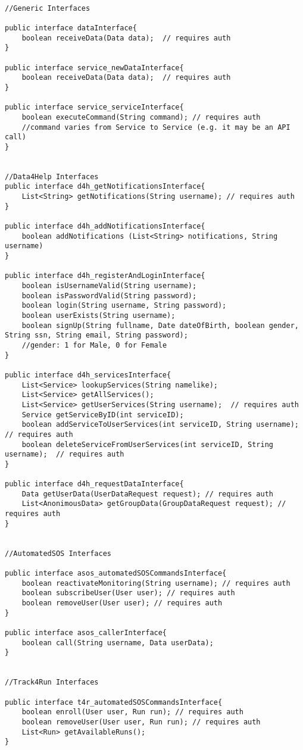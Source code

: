 \documentclass[../../DD.tex]{subfiles}
\begin{document}
\begin{lstlisting}

//Generic Interfaces

public interface dataInterface{
	boolean receiveData(Data data);  // requires auth
}

public interface service_newDataInterface{
	boolean receiveData(Data data);  // requires auth
}

public interface service_serviceInterface{
	boolean executeCommand(String command);	// requires auth
	//command varies from Service to Service (e.g. it may be an API call) 
}


//Data4Help Interfaces
public interface d4h_getNotificationsInterface{
	List<String> getNotifications(String username);	// requires auth
}

public interface d4h_addNotificationsInterface{
	boolean addNotifications (List<String> notifications, String username)
}

public interface d4h_registerAndLoginInterface{
	boolean isUsernameValid(String username);
	boolean isPasswordValid(String password);
	boolean login(String username, String password);
	boolean userExists(String username);
	boolean signUp(String fullname, Date dateOfBirth, boolean gender, String ssn, String email, String password);
	//gender: 1 for Male, 0 for Female
}

public interface d4h_servicesInterface{
	List<Service> lookupServices(String namelike);
	List<Service> getAllServices();
	List<Service> getUserServices(String username);  // requires auth
	Service getServiceByID(int serviceID);
	boolean addServiceToUserServices(int serviceID, String username);  // requires auth
	boolean deleteServiceFromUserServices(int serviceID, String username);  // requires auth
}

public interface d4h_requestDataInterface{
	Data getUserData(UserDataRequest request); // requires auth
	List<AnonimousData> getGroupData(GroupDataRequest request); // requires auth
}


//AutomatedSOS Interfaces

public interface asos_automatedSOSCommandsInterface{
	boolean reactivateMonitoring(String username); // requires auth
	boolean subscribeUser(User user); // requires auth
	boolean removeUser(User user); // requires auth
}

public interface asos_callerInterface{
	boolean call(String username, Data userData);
}


//Track4Run Interfaces

public interface t4r_automatedSOSCommandsInterface{
	boolean enroll(User user, Run run); // requires auth
	boolean removeUser(User user, Run run); // requires auth
	List<Run> getAvailableRuns();
}


\end{lstlisting}
\end{document}
